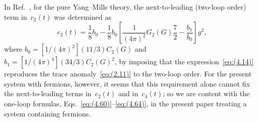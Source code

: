 In Ref.~\cite{Suzuki:2013gza}, for the pure Yang--Mills theory, the
next-to-leading (two-loop order) term in~$c_2(t)$ was determined as
\begin{equation}
   c_2(t)=\frac{1}{8}b_0
   -\frac{1}{8}b_0
   \left[\frac{1}{(4\pi)^2}G_2(G)\frac{7}{2}-\frac{b_1}{b_0}\right]g^2,
\label{eq:(4.69)}
\end{equation}
where $b_0=[1/(4\pi)^2](11/3)C_2(G)$ and~$b_1=[1/(4\pi)^4](34/3)C_2(G)^2$, by
imposing that the expression~\eqref{eq:(4.14)} reproduces the trace
anomaly~\eqref{eq:(2.11)} to the two-loop order. For the present system with
fermions, however, it seems that this requirement alone cannot fix the
next-to-leading terms in~$c_2(t)$ and in~$c_4(t)$; so we are content with the
one-loop formulas, Eqs.~\eqref{eq:(4.60)}--\eqref{eq:(4.64)}, in the present
paper treating a system containing fermions.


